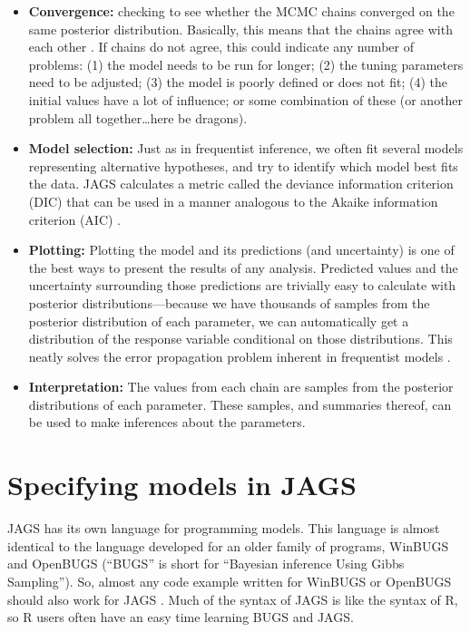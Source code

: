 \documentclass[
  13,
  letterpaper,
]{report}
\providecommand{\tightlist}{%
  \setlength{\itemsep}{0pt}\setlength{\parskip}{0pt}}
\begin{document}
\begin{itemize}
\tightlist
\item
  \textbf{Convergence:} checking to see whether the MCMC chains
  converged on the same posterior distribution. Basically, this means
  that the chains agree with each other . If chains do not agree, this
  could indicate any number of problems: (1) the model needs to be run
  for longer; (2) the tuning parameters need to be adjusted; (3) the
  model is poorly defined or does not fit; (4) the initial values have a
  lot of influence; or some combination of these (or another problem all
  together\ldots here be dragons).
\item
  \textbf{Model selection:} Just as in frequentist inference, we often
  fit several models representing alternative hypotheses, and try to
  identify which model best fits the data. JAGS calculates a metric
  called the deviance information criterion (DIC) that can be used in a
  manner analogous to the Akaike information criterion (AIC) .
\item
  \textbf{Plotting:} Plotting the model and its predictions (and
  uncertainty) is one of the best ways to present the results of any
  analysis. Predicted values and the uncertainty surrounding those
  predictions are trivially easy to calculate with posterior
  distributions---because we have thousands of samples from the
  posterior distribution of each parameter, we can automatically get a
  distribution of the response variable conditional on those
  distributions. This neatly solves the error propagation problem
  inherent in frequentist models .
\item
  \textbf{Interpretation:} The values from each chain are samples from
  the posterior distributions of each parameter. These samples, and
  summaries thereof, can be used to make inferences about the
  parameters.
\end{itemize}

\section{Specifying models in JAGS}\label{specifying-models-in-jags}

JAGS has its own language for programming models. This language is
almost identical to the language developed for an older family of
programs, WinBUGS and OpenBUGS (``BUGS'' is short for ``Bayesian
inference Using Gibbs Sampling''). So, almost any code example written
for WinBUGS or OpenBUGS should also work for JAGS . Much of the syntax
of JAGS is like the syntax of R, so R users often have an easy time
learning BUGS and JAGS.
\end{document}
